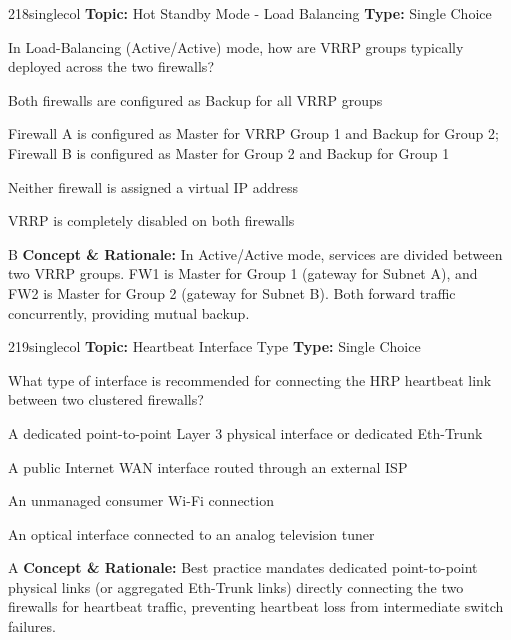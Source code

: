 \begin{qcard}{218}{singlecol}
\textcolor{darkslate!75}{\small\textbf{Topic:} Hot Standby Mode - Load Balancing \hfill \textbf{Type:} Single Choice}\vspace{0.4em}\par
In Load-Balancing (Active/Active) mode, how are VRRP groups typically deployed across the two firewalls?
\begin{qoptions}
\item Both firewalls are configured as Backup for all VRRP groups
\item Firewall A is configured as Master for VRRP Group 1 and Backup for Group 2; Firewall B is configured as Master for Group 2 and Backup for Group 1
\item Neither firewall is assigned a virtual IP address
\item VRRP is completely disabled on both firewalls
\end{qoptions}
\end{qcard}
\nopagebreak
\begin{explainbox}{B}
\textbf{Concept \& Rationale:} In Active/Active mode, services are divided between two VRRP groups. FW1 is Master for Group 1 (gateway for Subnet A), and FW2 is Master for Group 2 (gateway for Subnet B). Both forward traffic concurrently, providing mutual backup.
\end{explainbox}

\begin{qcard}{219}{singlecol}
\textcolor{darkslate!75}{\small\textbf{Topic:} Heartbeat Interface Type \hfill \textbf{Type:} Single Choice}\vspace{0.4em}\par
What type of interface is recommended for connecting the HRP heartbeat link between two clustered firewalls?
\begin{qoptions}
\item A dedicated point-to-point Layer 3 physical interface or dedicated Eth-Trunk
\item A public Internet WAN interface routed through an external ISP
\item An unmanaged consumer Wi-Fi connection
\item An optical interface connected to an analog television tuner
\end{qoptions}
\end{qcard}
\nopagebreak
\begin{explainbox}{A}
\textbf{Concept \& Rationale:} Best practice mandates dedicated point-to-point physical links (or aggregated Eth-Trunk links) directly connecting the two firewalls for heartbeat traffic, preventing heartbeat loss from intermediate switch failures.
\end{explainbox}

